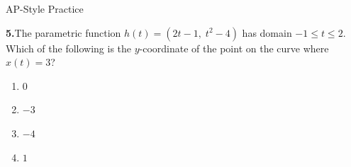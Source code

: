 \documentclass[10pt]{article}
\begin{document}
\vspace{0.08in}

\begin{notesbox}{AP-Style Practice}

\textbf{5.}\quad The parametric function $h(t) = (2t - 1,\; t^2 - 4)$
has domain $-1 \le t \le 2$. Which of the following is the
$y$-coordinate of the point on the curve where $x(t) = 3$?

\vspace{6pt}
\begin{enumerate}[label=(\Alph*), leftmargin=2em, itemsep=4pt]
  \item $0$
  \item $-3$
  \item $-4$
  \item $1$
\end{enumerate}

\end{notesbox}
\end{document}
